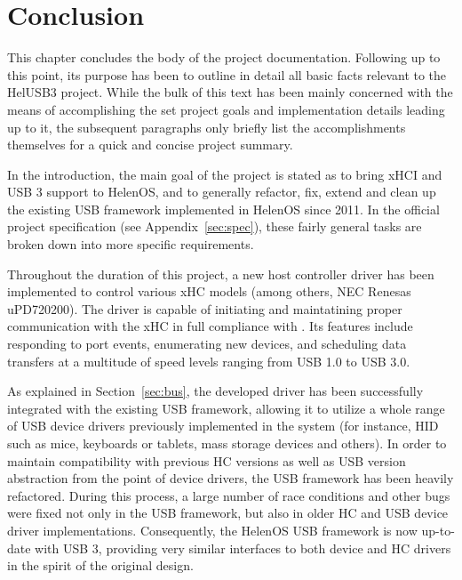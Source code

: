 \chapter*{Conclusion}

This chapter concludes the body of the project documentation. Following up to
this point, its purpose has been to outline in detail all basic facts relevant
to the HelUSB3 project. While the bulk of this text has been mainly concerned
with the means of accomplishing the set project goals and implementation details
leading up to it, the subsequent paragraphs only briefly list the
accomplishments themselves for a quick and concise project summary.

In the introduction, the main goal of the project is stated as to bring xHCI and
USB 3 support to HelenOS, and to generally refactor, fix, extend and clean up the
existing USB framework implemented in HelenOS since 2011. In the official
project specification (see Appendix~\ref{sec:spec}), these fairly general tasks
are broken down into more specific requirements.

Throughout the duration of this project, a new host controller driver has been
implemented to control various xHC models (among others, NEC Renesas
uPD720200). The driver is capable of initiating and maintatining proper
communication with the xHC in full compliance with \cite{xhci}. Its features
include responding to port events, enumerating new devices, and scheduling data
transfers at a multitude of speed levels ranging from USB 1.0 to USB 3.0.

As explained in Section~\ref{sec:bus}, the developed driver has been successfully
integrated with the existing USB framework, allowing it to utilize a whole range
of USB device drivers previously implemented in the system (for instance, HID
such as mice, keyboards or tablets, mass storage devices and others). In order
to maintain compatibility with previous HC versions as well as USB version
abstraction from the point of device drivers, the USB framework has been heavily
refactored. During this process, a large number of race conditions and other
bugs were fixed not only in the USB framework, but also in older HC and USB
device driver implementations. Consequently, the HelenOS USB framework is now
up-to-date with USB 3, providing very similar interfaces to both device and HC
drivers in the spirit of the original design.

